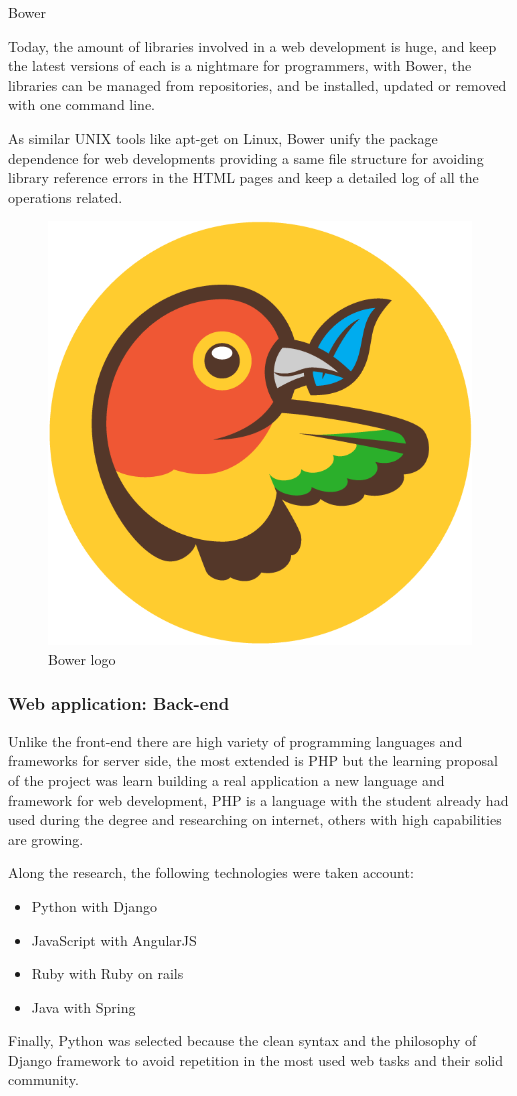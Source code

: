 \documentclass{DeustoFDP}
\begin{document}
{\large Bower}

Today, the amount of libraries involved in a web development is huge, and keep the latest versions of each is a nightmare for programmers, with Bower, the libraries can be managed from repositories, and be installed, updated or removed with one command line.

As similar UNIX tools like apt-get on Linux, Bower unify the package dependence for web developments providing a same file structure for avoiding library reference errors in the HTML pages and keep a detailed log of all the operations related.

\begin{figure}[h]
\centering
\includegraphics[width=0.3\linewidth]{fig/Bower}
\caption[Bower logo]{Bower logo}
\label{fig:Bower}
\end{figure}


\subsubsection{Web application: Back-end}
Unlike the front-end there are high variety of programming languages and frameworks for server side, the most extended is PHP but the learning proposal of the project was learn building a real application a new language and framework for web development, PHP is a language with the student already had used during the degree and researching on internet, others with high capabilities are growing.

Along the research, the following technologies were taken account:
\begin{itemize}
	\item Python with Django
	\item JavaScript with AngularJS
	\item Ruby with Ruby on rails
	\item Java with Spring
\end{itemize}

Finally, Python was selected because the clean syntax and the philosophy of Django framework to avoid repetition in the most used web tasks and their solid community.
\end{document}
